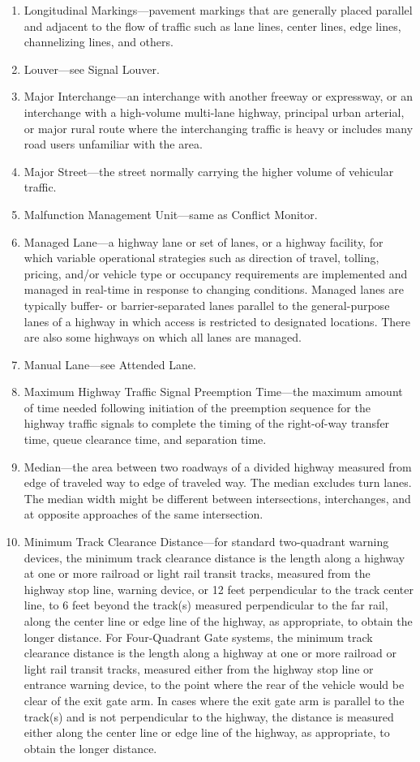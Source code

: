 \documentclass[9pt]{memoir}
\begin{document}
{\begin{enumerate}[label=\arabic*., ref=\arabic*]
\item Longitudinal Markings---pavement markings that are generally placed parallel and adjacent to the flow of traffic such as lane lines, center lines, edge lines, channelizing lines, and others.
\item Louver---see Signal Louver.
\item Major Interchange---an interchange with another freeway or expressway, or an interchange with a high-volume multi-lane highway, principal urban arterial, or major rural route where the interchanging traffic is heavy or includes many road users unfamiliar with the area.
\item Major Street---the street normally carrying the higher volume of vehicular traffic.
\item Malfunction Management Unit---same as Conflict Monitor.
\item Managed Lane---a highway lane or set of lanes, or a highway facility, for which variable operational strategies such as direction of travel, tolling, pricing, and/or vehicle type or occupancy requirements are implemented and managed in real-time in response to changing conditions. Managed lanes are typically buffer- or barrier-separated lanes parallel to the general-purpose lanes of a highway in which access is restricted to designated locations. There are also some highways on which all lanes are managed.
\item Manual Lane---see Attended Lane.
\item Maximum Highway Traffic Signal Preemption Time---the maximum amount of time needed following initiation of the preemption sequence for the highway traffic signals to complete the timing of the right-of-way transfer time, queue clearance time, and separation time.
\item Median---the area between two roadways of a divided highway measured from edge of traveled way to edge of traveled way. The median excludes turn lanes. The median width might be different between intersections, interchanges, and at opposite approaches of the same intersection.
\item Minimum Track Clearance Distance---for standard two-quadrant warning devices, the minimum track clearance distance is the length along a highway at one or more railroad or light rail transit tracks, measured from the highway stop line, warning device, or 12 feet perpendicular to the track center line, to 6 feet beyond the track(s) measured perpendicular to the far rail, along the center line or edge line of the highway, as appropriate, to obtain the longer distance. For Four-Quadrant Gate systems, the minimum track clearance distance is the length along a highway at one or more railroad or light rail transit tracks, measured either from the highway stop line or entrance warning device, to the point where the rear of the vehicle would be clear of the exit gate arm. In cases where the exit gate arm is parallel to the track(s) and is not perpendicular to the highway, the distance is measured either along the center line or edge line of the highway, as appropriate, to obtain the longer distance.

\end{enumerate}}
\end{document}

